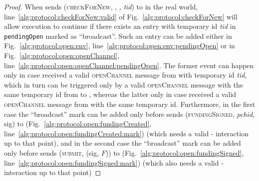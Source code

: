 \begin{proof}
  When \environment{} sends (\textsc{checkForNew}, \alice, \bob, \textit{tid}) to
  \alice{} in the real world, line~\ref{alg:protocol:checkForNew:valid} of
  Fig.~\ref{alg:protocol:checkForNew} will allow execution to continue if there
  exists an entry with temporary id \textit{tid} in \texttt{pendingOpen}
  marked as ``broadcast''. Such an entry can be added either in
  Fig.~\ref{alg:protocol:open:env},
  line~\ref{alg:protocol:open:env:pendingOpen} or in
  Fig.~\ref{alg:protocol:open:openChannel},
  line~\ref{alg:protocol:open:openChannel:pendingOpen}. The former event can
  happen only in case \alice{} received a valid \textsc{openChannel} message
  from \bob{} with temporary id \textit{tid}, which in turn can be triggered
  only by a valid \textsc{openChannel} message with the same temporary id from
  \environment{} to \bob{}, whereas the latter only in case \alice{} received
  a valid \textsc{openChannel} message from \environment{} with the same
  temporary id. Furthermore, in the first case the ``broadcast'' mark can be
  added only before \alice{} sends (\textsc{fundingSigned}, \textit{pchid},
  sig) to \bob{} (Fig.~\ref{alg:protocol:open:fundingCreated},
  line~\ref{alg:protocol:open:fundingCreated:mark}) (which needs a valid
  \alice-\bob{} interaction up to that point), and in the second case the
  ``broadcast'' mark can be added only before \alice{} sends (\textsc{submit},
  (sig, $F$)) to \ledger{} (Fig.~\ref{alg:protocol:open:fundingSigned},
  line~\ref{alg:protocol:open:fundingSigned:mark}) (which also needs a valid
  \alice-\bob{} interaction up to that point)


\end{proof}
